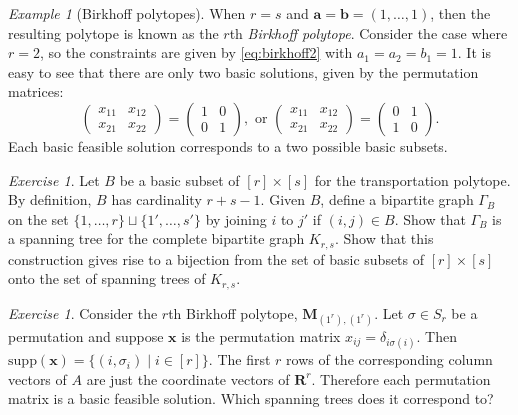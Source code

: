 \documentclass{amsbook}
\newcommand{\xx}{\mathbf x}
\newcommand{\bb}{\mathbf b}
\renewcommand{\aa}{\mathbf a}
\newcommand{\supp}{\mathrm{supp}}
\newcommand{\RR}{\mathbf R}
\newcommand{\MM}{\mathbf M}
\theoremstyle{definition}
\theoremstyle{remark}
\newtheorem{example}[theorem]{Example}
\newtheorem{exercise}[theorem]{Exercise}
\begin{document}
\begin{example}[Birkhoff polytopes]
  \label{example:birkhoff}
  When $r=s$ and $\aa=\bb=(1,\dotsc,1)$, then the resulting polytope is known as the $r$th \emph{Birkhoff polytope}.
  Consider the case where $r=2$, so the constraints are given by \eqref{eq:birkhoff2} with $a_1=a_2=b_1=1$.
  It is easy to see that there are only two basic solutions, given by the permutation matrices:
  \begin{displaymath}
    \begin{pmatrix}
      x_{11} & x_{12}\\
      x_{21} & x_{22}
    \end{pmatrix}
    =
    \begin{pmatrix}
      1 & 0\\
      0 & 1
    \end{pmatrix}, \text{ or }
    \begin{pmatrix}
      x_{11} & x_{12}\\
      x_{21} & x_{22}
    \end{pmatrix}
    =
    \begin{pmatrix}
      0 & 1\\
      1 & 0
    \end{pmatrix}.
  \end{displaymath}
  Each basic feasible solution corresponds to a two possible basic subsets.
\end{example}
\begin{exercise}
  \label{exercise:basic_spanning_trees}
  Let $B$ be a basic subset of $[r]\times [s]$ for the transportation polytope.
  By definition, $B$ has cardinality $r+s-1$.
  Given $B$, define a bipartite graph $\Gamma_B$ on the set $\{1,\dotsc,r\}\sqcup \{1',\dotsc,s'\}$ by joining $i$ to $j'$ if $(i,j)\in B$.
  Show that $\Gamma_B$ is a spanning tree for the complete bipartite graph $K_{r,s}$.
  Show that this construction gives rise to a bijection from the set of basic subsets of $[r]\times[s]$ onto the set of spanning trees of $K_{r,s}$.
\end{exercise}
\begin{exercise}
  Consider the $r$th Birkhoff polytope, $\MM_{(1^r),(1^r)}$.
  Let $\sigma\in S_r$ be a permutation and suppose $\xx$ is the permutation matrix $x_{ij}=\delta_{i\sigma(i)}$.
  Then $\supp(\xx)=\{(i,\sigma_i)\mid i\in [r]\}$.
  The first $r$ rows of the corresponding column vectors of $A$ are just the coordinate vectors of $\RR^r$.
  Therefore each permutation matrix is a basic feasible solution.
  Which spanning trees does it correspond to?
\end{exercise}
\end{document}
